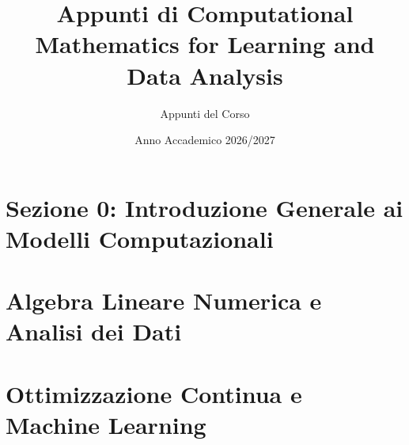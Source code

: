 \documentclass[12pt,a4paper,oneside]{report}
\title{\textbf{Appunti di Computational Mathematics for Learning and Data Analysis}}
\author{Appunti del Corso}
\date{Anno Accademico 2026/2027}
\begin{document}
\maketitle
\tableofcontents

\clearpage
{}

\cleardoublepage
{}
{}
\part*{Sezione 0: Introduzione Generale ai Modelli Computazionali}
\setcounter{chapter}{-1}


\part{Algebra Lineare Numerica e Analisi dei Dati}








\part{Ottimizzazione Continua e Machine Learning}







\clearpage
\begingroup
\sloppy
{}
{}


\endgroup
\end{document}
